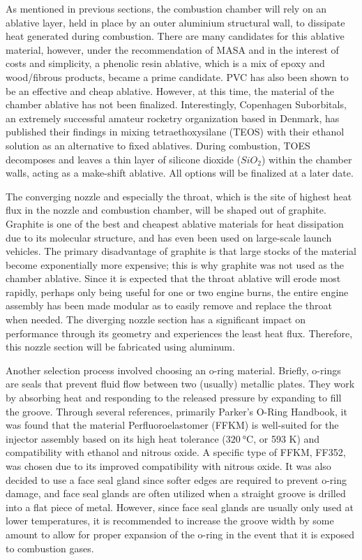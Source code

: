 \documentclass[9pt]{article} %
\numberwithin{equation}{section} %
\begin{document}
As mentioned in previous sections, the combustion chamber will rely on an ablative layer, held in place by an outer aluminium structural wall, to dissipate heat generated during combustion. There are many candidates for this ablative material, however, under the recommendation of MASA and in the interest of costs and simplicity, a phenolic resin ablative, which is a mix of epoxy and wood/fibrous products, became a prime candidate. PVC has also been shown to be an effective and cheap ablative. However, at this time, the material of the chamber ablative has not been finalized. Interestingly, Copenhagen Suborbitals, an extremely successful amateur rocketry organization based in Denmark, has published their findings in mixing tetraethoxysilane (TEOS) with their ethanol solution as an alternative to fixed ablatives. During combustion, TOES decomposes and leaves a thin layer of silicone dioxide ($SiO_{2}$) within the chamber walls, acting as a make-shift ablative. All options will be finalized at a later date.

The converging nozzle and especially the throat, which is the site of highest heat flux in the nozzle and combustion chamber, will be shaped out of graphite. Graphite is one of the best and cheapest ablative materials for heat dissipation due to its molecular structure, and has even been used on large-scale launch vehicles. The primary disadvantage of graphite is that large stocks of the material become exponentially more expensive; this is why graphite was not used as the chamber ablative. Since it is expected that the throat ablative will erode most rapidly, perhaps only being useful for one or two engine burns, the entire engine assembly has been made modular as to easily remove and replace the throat when needed. The diverging nozzle section has a significant impact on performance through its geometry and experiences the least heat flux. Therefore, this nozzle section will be fabricated using aluminum.

Another selection process involved choosing an o-ring material. Briefly, o-rings are seals that prevent fluid flow between two (usually) metallic plates. They work by absorbing heat and responding to the released pressure by expanding to fill the groove. Through several references, primarily Parker’s O-Ring Handbook, it was found that the material Perfluoroelastomer (FFKM) is well-suited for the injector assembly based on its high heat tolerance ($\SI{320}{\celsius}$, or 593 K) and compatibility with ethanol and nitrous oxide. A specific type of FFKM, FF352, was chosen due to its improved compatibility with nitrous oxide. It was also decided to use a face seal gland since softer edges are required to prevent o-ring damage, and face seal glands are often utilized when a straight groove is drilled into a flat piece of metal. However, since face seal glands are usually only used at lower temperatures, it is recommended to increase the groove width by some amount to allow for proper expansion of the o-ring in the event that it is exposed to combustion gases. 
\end{document}
